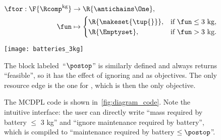 \begin{figure*}[p]
\quad\quad
\begin{minipage}[c]{5cm}
    \begin{align*}
        \ftor:\F{\Rcomp^{\text{kg}}} & \rightarrow\R{\antichains\One}, \\
        \fun                         & \mapsto\begin{cases}
                                                  \R{\makeset{\tup{ } }}, & \text{if }\fun\leq\text{3 kg}, \\
                                                  \R{\Emptyset},          & \text{if }\fun>\text{3 kg}.
                                              \end{cases}
    \end{align*}

\end{minipage}\quad\texttt{[image: batteries\_3kg]}

\smallskip{}

\noindent The block labeled~``$\postop$'' is similarly defined and always returns ``feasible'', so it has the effect of ignoring  and  as objectives.
The only resource edge is the one for , which is then the only objective.

The MCDPL code is shown in~\cref{fig:diagram_code}.
Note the intuitive interface: the user can directly write ``mass required by battery $\leq$ 3 kg'' and ``ignore maintenance required by battery'', which is compiled to ``maintenance required by battery $\leq\postop$''.

\begin{figure}
    \begin{centering}
    \end{centering}
    \begin{centering}
    \end{centering}
    \smallskip{}


\end{figure}
\end{figure*}
